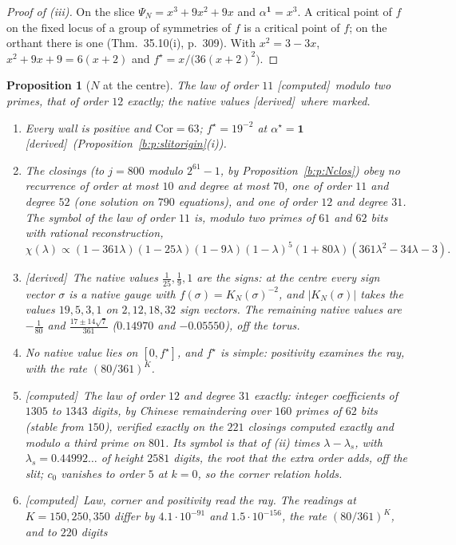 \documentclass[11pt]{article}
\newcommand{\one}{\mathbf 1}
\theoremstyle{plain}
\newtheorem{proposition}{Proposition}[section]
\theoremstyle{definition}
\theoremstyle{remark}
\newcommand{\derived}{\textup{[derived]}}
\newcommand{\computed}{\textup{[computed]}}
\begin{document}
\begin{proof}[Proof of (iii)]
On the slice $\Psi_N=x^3+9x^2+9x$ and $\alpha^\one=x^3$. A critical point of $f$ on the fixed locus of a group of symmetries of $f$ is a critical point of $f$; on the orthant there is one (Thm.~35.10(i), p.~309). With $x^2=3-3x$, $x^2+9x+9=6(x+2)$ and $f^\star=x/\big(36(x+2)^2\big)$.
\end{proof}

\begin{proposition}[$N$ at the centre]\label{b:p:Ncentre}The law of order $11$ \computed\ modulo two primes, that of order $12$ exactly; the native values \derived\ where marked.\
\begin{enumerate}[label=(\roman*)]
\item Every wall is positive and $\mathrm{Cor}=63$; $f^\star=19^{-2}$ at $\alpha^\star=\one$ \derived\ (Proposition~\ref{b:p:slitorigin}(i)).
\item The closings (to $j=800$ modulo $2^{61}-1$, by Proposition~\ref{b:p:Nclos}) obey no recurrence of order at most $10$ and degree at most $70$, one of order $11$ and degree $52$ (one solution on $790$ equations), and one of order $12$ and degree $31$. The symbol of the law of order $11$ is, modulo two primes of $61$ and $62$ bits with rational reconstruction,
\[
\chi(\lambda)\propto(1-361\lambda)(1-25\lambda)(1-9\lambda)(1-\lambda)^5(1+80\lambda)(361\lambda^2-34\lambda-3).
\]
\item \derived\ The native values $\frac1{25},\frac19,1$ are the signs: at the centre every sign vector $\sigma$ is a native gauge with $f(\sigma)=K_N(\sigma)^{-2}$, and $|K_N(\sigma)|$ takes the values $19,5,3,1$ on $2,12,18,32$ sign vectors. The remaining native values are $-\frac1{80}$ and $\frac{17\pm14\sqrt7}{361}$ ($0.14970$ and $-0.05550$), off the torus.
\item No native value lies on $[0,f^\star]$, and $f^\star$ is simple: positivity examines the ray, with the rate $(80/361)^K$.
\item \computed\ The law of order $12$ and degree $31$ exactly: integer coefficients of $1305$ to $1343$ digits, by Chinese remaindering over $160$ primes of $62$ bits (stable from $150$), verified exactly on the $221$ closings computed exactly and modulo a third prime on $801$. Its symbol is that of (ii) times $\lambda-\lambda_s$, with $\lambda_s=0.44992\ldots$ of height $2581$ digits, the root that the extra order adds, off the slit; $c_0$ vanishes to order $5$ at $k=0$, so the corner relation holds.
\item \computed\ Law, corner and positivity read the ray. The readings at $K=150,250,350$ differ by $4.1\cdot10^{-91}$ and $1.5\cdot10^{-156}$, the rate $(80/361)^K$, and to $220$ digits

\end{enumerate}
\end{proposition}
\end{document}
